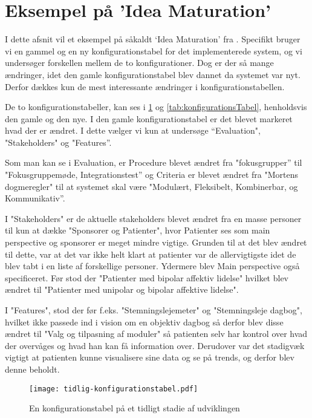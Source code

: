 \section{Eksempel på 'Idea Maturation'}
I dette afsnit vil et eksempel på såkaldt `Idea Maturation' fra \citet[Kapitel 23]{art:essence}.
Specifikt bruger vi en gammel og en ny konfigurationstabel for det implementerede system, og vi undersøger forskellen mellem de to konfigurationer.
Dog er der så mange ændringer, idet den gamle konfigurationstabel blev dannet da systemet var nyt. 
Derfor dækkes kun de mest interessante ændringer i konfigurationstabellen.

De to konfigurationstabeller, kan ses i \cref{tab:tidligKonfigurationsTabel} og \cref{tab:konfigurationsTabel}, henholdsvis den gamle og den nye. 
I den gamle konfigurationstabel er det blevet markeret hvad der er ændret.
I dette vælger vi kun at undersøge ``Evaluation", "Stakeholders" og "Features''. 

Som man kan se i Evaluation, er Procedure blevet ændret fra "fokusgrupper'' til "Fokusgruppemøde, Integrationstest'' og Criteria er blevet ændret fra "Mortens dogmeregler" til at systemet skal være "Modulært, Fleksibelt, Kombinerbar, og Kommunikativ''. 

I "Stakeholders" er de aktuelle stakeholders blevet ændret fra en masse personer til kun at dække "Sponsorer og Patienter", hvor Patienter ses som main perspective og sponsorer er meget mindre vigtige. 
Grunden til at det blev ændret til dette, var at det var ikke helt klart at patienter var de allervigtigste idet de blev tabt i en liste af forskellige personer.
Ydermere blev Main perspective også specificeret.
Før stod der "Patienter med bipolar affektiv lidelse" hvilket blev ændret til "Patienter med unipolar og bipolar affektive lidelse". 

I "Features", stod der før f.eks. "Stemningslejemeter" og "Stemningsleje dagbog", hvilket ikke passede ind i vision om en objektiv dagbog så derfor blev disse ændret til "Valg og tilpasning af moduler" så patienten selv har kontrol over hvad der overvåges og hvad han kan få information over. Derudover var det stadigvæk vigtigt at patienten kunne visualisere sine data og se på trends, og derfor blev denne beholdt. 

\begin{figure}
	\texttt{[image: tidlig-konfigurationstabel.pdf]}
	\caption{En konfigurationstabel på et tidligt stadie af udviklingen}
	\label{tab:tidligKonfigurationsTabel}
\end{figure}